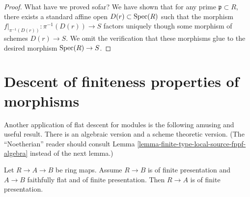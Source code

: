 \begin{proof}
\medskip\noindent
What have we proved sofar? We have shown that for any prime
$\mathfrak p \subset R$, there exists a standard affine open
$D(r) \subset \mathop{\rm Spec}(R)$ such that the morphism
$f|_{\pi^{-1}(D(r))} : \pi^{-1}(D(r)) \to S$ factors uniquely
though some morphism of schemes $D(r) \to S$. We omit the
verification that these morphisms glue to the desired
morphism $\mathop{\rm Spec}(R) \to S$.
\end{proof}




\section{Descent of finiteness properties of morphisms}
\label{section-descent-finiteness-morphisms}

\noindent
Another application of flat descent for modules is the following
amusing and useful result. There is an algebraic version and a
scheme theoretic version. (The ``Noetherian'' reader should
consult Lemma \ref{lemma-finite-type-local-source-fppf-algebra}
instead of the next lemma.)

\begin{lemma}
\label{lemma-flat-finitely-presented-permanence-algebra}
Let $R \to A \to B$ be ring maps.
Assume $R \to B$ is of finite presentation and
$A \to B$ faithfully flat and of finite presentation.
Then $R \to A$ is of finite presentation.
\end{lemma}


